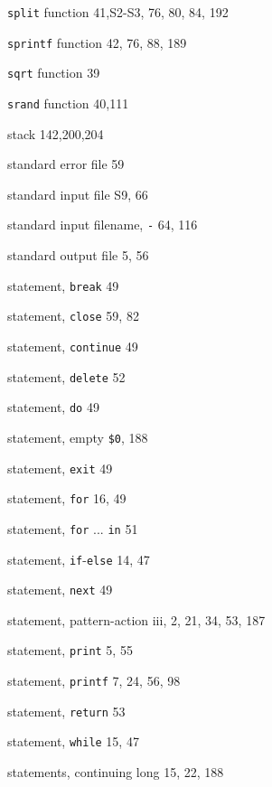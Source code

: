 \begin{multicols}{3}
\hangindent=3pc  \verb'split' function 41,S2-S3, 76, 80, 84, 192

\hangindent=3pc  \verb'sprintf' function 42, 76, 88, 189

\hangindent=3pc  \verb'sqrt' function 39

\hangindent=3pc  \verb'srand' function 40,111

\hangindent=3pc  stack 142,200,204

\hangindent=3pc  standard error file 59

\hangindent=3pc  standard input file S9, 66

\hangindent=3pc  standard input filename, \verb'-' 64, 116

\hangindent=3pc  standard output file 5, 56

\hangindent=3pc  statement, \verb'break' 49

\hangindent=3pc  statement, \verb'close' 59, 82

\hangindent=3pc  statement, \verb'continue' 49

\hangindent=3pc  statement, \verb'delete' 52

\hangindent=3pc  statement, \verb'do' 49

\hangindent=3pc  statement, empty \verb'$0', 188

\hangindent=3pc  statement, \verb'exit' 49

\hangindent=3pc  statement, \verb'for' 16, 49

\hangindent=3pc  statement, \verb'for' ... \verb'in' 51

\hangindent=3pc  statement, \verb'if'-\verb'else' 14, 47

\hangindent=3pc  statement, \verb'next' 49

\hangindent=3pc  statement, pattern-action iii, 2, 21, 34, 53, 187

\hangindent=3pc  statement, \verb'print' 5, 55

\hangindent=3pc  statement, \verb'printf' 7, 24, 56, 98

\hangindent=3pc  statement, \verb'return' 53

\hangindent=3pc  statement, \verb'while' 15, 47

\hangindent=3pc  statements, continuing long 15, 22, 188


\end{multicols}
